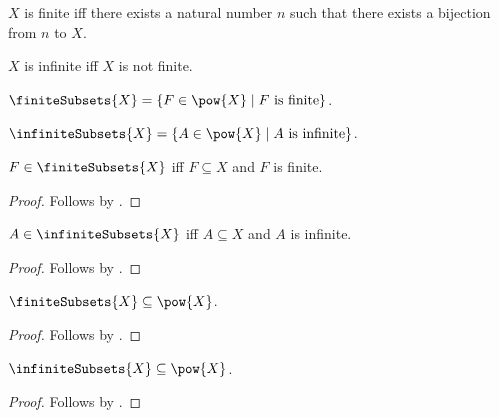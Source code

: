 \begin{definition}\label{finite}
    $X$ is finite iff there exists a natural number $n$ such that
        there exists a bijection from $n$ to $X$.
\end{definition}

\begin{abbreviation}\label{infinite}
    $X$ is infinite iff $X$ is not finite.
\end{abbreviation}

\begin{definition}\label{finite_subsets}
    $\finiteSubsets{X}=\{F\in\pow{X}\mid \text{$F$ is finite}\}$.
\end{definition}

\begin{definition}\label{infinite_subsets}
    $\infiniteSubsets{X}=\{A\in\pow{X}\mid \text{$A$ is infinite}\}$.
\end{definition}

\begin{proposition}\label{finite_subsets_iff}
    $F\in\finiteSubsets{X}$ iff $F\subseteq X$ and $F$ is finite.
\end{proposition}
\begin{proof}
    Follows by .
\end{proof}

\begin{proposition}\label{infinite_subsets_iff}
    $A\in\infiniteSubsets{X}$ iff $A\subseteq X$ and $A$ is infinite.
\end{proposition}
\begin{proof}
    Follows by .
\end{proof}

\begin{proposition}\label{finite_subsets_subset_powerset}
    $\finiteSubsets{X}\subseteq\pow{X}$.
\end{proposition}
\begin{proof}
    Follows by .
\end{proof}

\begin{proposition}\label{infinite_subsets_subset_powerset}
    $\infiniteSubsets{X}\subseteq\pow{X}$.
\end{proposition}
\begin{proof}
    Follows by .
\end{proof}

